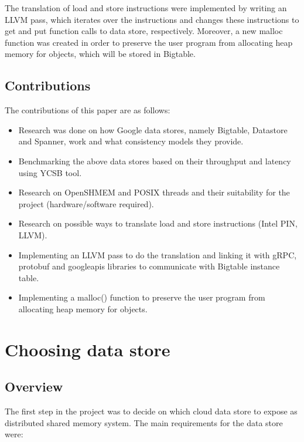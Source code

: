 \documentclass[bsc,frontabs,twoside,singlespacing,parskip,deptreport]{infthesis}     %
\begin{document}

The translation of load and store instructions were implemented by writing an LLVM pass, which iterates over the instructions and changes these instructions to get and put function calls to data store, respectively. Moreover, a new malloc function was created in order to preserve the user program from allocating heap memory for objects, which will be stored in Bigtable.



\section{Contributions}

The contributions of this paper are as follows:
\begin{itemize}
\item
Research was done on how Google data stores, namely Bigtable, Datastore and Spanner, work and what consistency models they provide.
\item
Benchmarking the above data stores based on their throughput and latency using YCSB tool.
\item
Research on OpenSHMEM and POSIX threads and their suitability for the project (hardware/software required).
\item
Research on possible ways to translate load and store instructions (Intel PIN, LLVM).
\item
Implementing an LLVM pass to do the translation and linking it with gRPC, protobuf and googleapis libraries to communicate with Bigtable instance table.
\item
Implementing a malloc() function to preserve the user program from allocating heap memory for objects.
\end{itemize}


\chapter{Choosing data store}

\section{Overview}

The first step in the project was to decide on which cloud data store to expose as distributed shared memory system. The main requirements for the data store were:
\end{document}
